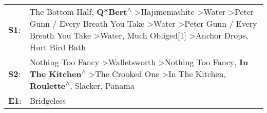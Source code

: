 \begin{supertabular}{p{0.03\textwidth}p{0.92\textwidth}}
 \textbf{S1}:  &  The Bottom Half\textsuperscript{}, \enspace \textbf{Q*Bert\textsuperscript{$\wedge$}} \textgreater \enspace Hajimemashite\textsuperscript{} \textgreater \enspace Water\textsuperscript{} \textgreater \enspace Peter Gunn / Every Breath You Take\textsuperscript{} \textgreater \enspace Water\textsuperscript{} \textgreater \enspace Peter Gunn / Every Breath You Take\textsuperscript{} \textgreater \enspace Water\textsuperscript{}, \enspace Much Obliged[1]\textsuperscript{} \textgreater \enspace Anchor Drops\textsuperscript{}, \enspace Hurt Bird Bath\textsuperscript{}  \enspace  \\
 \textbf{S2}:  &                                                                                                                               Nothing Too Fancy\textsuperscript{} \textgreater \enspace Walletsworth\textsuperscript{} \textgreater \enspace Nothing Too Fancy\textsuperscript{}, \enspace \textbf{In The Kitchen\textsuperscript{$\wedge$}} \textgreater \enspace The Crooked One\textsuperscript{} \textgreater \enspace In The Kitchen\textsuperscript{}, \enspace \textbf{Roulette\textsuperscript{$\wedge$}}, \enspace Slacker\textsuperscript{}, \enspace Panama\textsuperscript{}  \enspace  \\
 \textbf{E1}:  &                                                                                                                                                                                                                                                                                                                                                                                                                                                                                                                                                             Bridgeless\textsuperscript{}  \enspace  \\
\end{supertabular}

